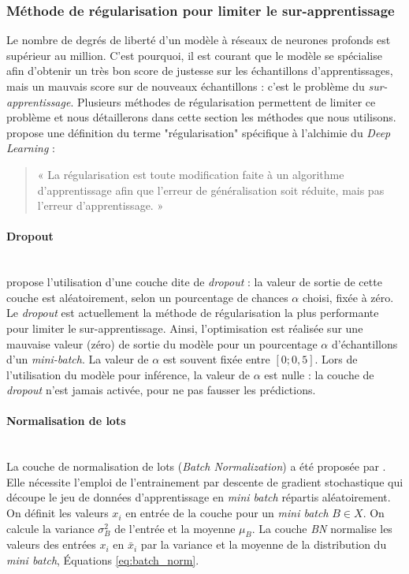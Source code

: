 \subsubsection{Méthode de régularisation pour limiter le sur-apprentissage}
Le nombre de degrés de liberté d'un modèle à réseaux de neurones profonds est supérieur au million.
C'est pourquoi, il est courant que le modèle se spécialise afin d'obtenir un très bon score de justesse sur les échantillons d'apprentissages, mais un mauvais score sur de nouveaux échantillons : c'est le problème du \emph{sur-apprentissage}.
Plusieurs méthodes de régularisation permettent de limiter ce problème et nous détaillerons dans cette section les méthodes que nous utilisons.
\cite{goodfellow_deep_2016} propose une définition du terme "régularisation" spécifique à l'alchimie du \textit{Deep Learning} :
\begin{quote}
    « La régularisation est toute modification faite à un algorithme d'apprentissage afin que l'erreur de généralisation soit réduite, mais pas l'erreur d'apprentissage. »
\end{quote}

\paragraph{Dropout}\mbox{} \label{parag:dropout} \\
\cite{srivastava_dropout_2014} propose l'utilisation d'une couche dite de \textit{dropout} : la valeur de sortie de cette couche est aléatoirement, selon un pourcentage de chances $\alpha$ choisi, fixée à zéro. Le \textit{dropout} est actuellement la méthode de régularisation la plus performante pour limiter le sur-apprentissage.
Ainsi, l'optimisation est réalisée sur une mauvaise valeur (zéro) de sortie du modèle pour un pourcentage $\alpha$ d'échantillons d'un \textit{mini-batch}.
La valeur de $\alpha$ est souvent fixée entre $[0 ; 0,5]$.
Lors de l'utilisation du modèle pour inférence, la valeur de $\alpha$ est nulle : la couche de \textit{dropout} n'est jamais activée, pour ne pas fausser les prédictions.

\paragraph{Normalisation de lots}\mbox{} \label{parag:batchnorm} \\
La couche de normalisation de lots (\textit{Batch Normalization}) a été proposée par \cite{ioffe_batch_2015}.
Elle nécessite l'emploi de l'entrainement par descente de gradient stochastique qui découpe le jeu de données d'apprentissage en \textit{mini batch} répartis aléatoirement.
On définit les valeurs $x_i$ en entrée de la couche pour un \textit{mini batch} $B \in X$.
On calcule la variance $\sigma_B^2$ de l'entrée et la moyenne $\mu_B$.
La couche \textit{BN} normalise les valeurs des entrées $x_i$ en $\bar{x}_{i}$ par la variance et la moyenne de la distribution du \textit{mini batch}, Équations \ref{eq:batch_norm}.

